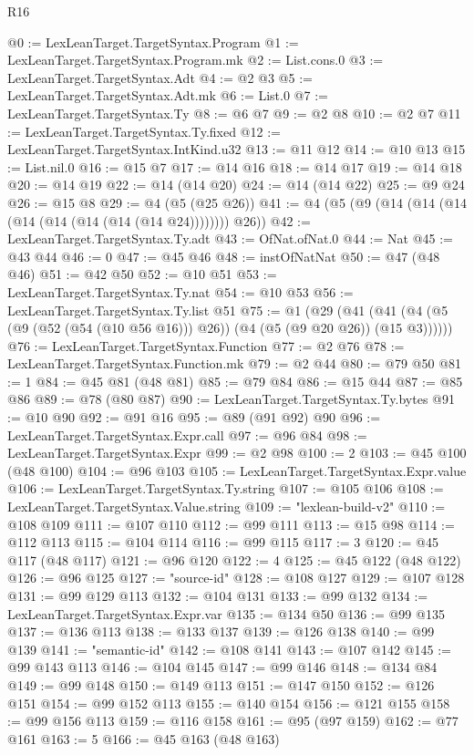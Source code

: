 \begin{lexlean}{R16}
\begin{coremodule}
@0 := LexLeanTarget.TargetSyntax.Program
@1 := LexLeanTarget.TargetSyntax.Program.mk
@2 := List.cons.{0}
@3 := LexLeanTarget.TargetSyntax.Adt
@4 := @2 @3
@5 := LexLeanTarget.TargetSyntax.Adt.mk
@6 := List.{0}
@7 := LexLeanTarget.TargetSyntax.Ty
@8 := @6 @7
@9 := @2 @8
@10 := @2 @7
@11 := LexLeanTarget.TargetSyntax.Ty.fixed
@12 := LexLeanTarget.TargetSyntax.IntKind.u32
@13 := @11 @12
@14 := @10 @13
@15 := List.nil.{0}
@16 := @15 @7
@17 := @14 @16
@18 := @14 @17
@19 := @14 @18
@20 := @14 @19
@22 := @14 (@14 @20)
@24 := @14 (@14 @22)
@25 := @9 @24
@26 := @15 @8
@29 := @4 (@5 (@25 @26))
@41 := @4 (@5 (@9 (@14 (@14 (@14 (@14 (@14 (@14 (@14 (@14 @24)))))))) @26))
@42 := LexLeanTarget.TargetSyntax.Ty.adt
@43 := OfNat.ofNat.{0}
@44 := Nat
@45 := @43 @44
@46 := 0
@47 := @45 @46
@48 := instOfNatNat
@50 := @47 (@48 @46)
@51 := @42 @50
@52 := @10 @51
@53 := LexLeanTarget.TargetSyntax.Ty.nat
@54 := @10 @53
@56 := LexLeanTarget.TargetSyntax.Ty.list @51
@75 := @1
    (@29 (@41 (@41 (@4 (@5 (@9 (@52 (@54 (@10 @56 @16))) @26)) (@4 (@5 (@9 @20 @26)) (@15 @3))))))
@76 := LexLeanTarget.TargetSyntax.Function
@77 := @2 @76
@78 := LexLeanTarget.TargetSyntax.Function.mk
@79 := @2 @44
@80 := @79 @50
@81 := 1
@84 := @45 @81 (@48 @81)
@85 := @79 @84
@86 := @15 @44
@87 := @85 @86
@89 := @78 (@80 @87)
@90 := LexLeanTarget.TargetSyntax.Ty.bytes
@91 := @10 @90
@92 := @91 @16
@95 := @89 (@91 @92) @90
@96 := LexLeanTarget.TargetSyntax.Expr.call
@97 := @96 @84
@98 := LexLeanTarget.TargetSyntax.Expr
@99 := @2 @98
@100 := 2
@103 := @45 @100 (@48 @100)
@104 := @96 @103
@105 := LexLeanTarget.TargetSyntax.Expr.value
@106 := LexLeanTarget.TargetSyntax.Ty.string
@107 := @105 @106
@108 := LexLeanTarget.TargetSyntax.Value.string
@109 := "lexlean-build-v2"
@110 := @108 @109
@111 := @107 @110
@112 := @99 @111
@113 := @15 @98
@114 := @112 @113
@115 := @104 @114
@116 := @99 @115
@117 := 3
@120 := @45 @117 (@48 @117)
@121 := @96 @120
@122 := 4
@125 := @45 @122 (@48 @122)
@126 := @96 @125
@127 := "source-id"
@128 := @108 @127
@129 := @107 @128
@131 := @99 @129 @113
@132 := @104 @131
@133 := @99 @132
@134 := LexLeanTarget.TargetSyntax.Expr.var
@135 := @134 @50
@136 := @99 @135
@137 := @136 @113
@138 := @133 @137
@139 := @126 @138
@140 := @99 @139
@141 := "semantic-id"
@142 := @108 @141
@143 := @107 @142
@145 := @99 @143 @113
@146 := @104 @145
@147 := @99 @146
@148 := @134 @84
@149 := @99 @148
@150 := @149 @113
@151 := @147 @150
@152 := @126 @151
@154 := @99 @152 @113
@155 := @140 @154
@156 := @121 @155
@158 := @99 @156 @113
@159 := @116 @158
@161 := @95 (@97 @159)
@162 := @77 @161
@163 := 5
@166 := @45 @163 (@48 @163)

\end{coremodule}
\end{lexlean}
